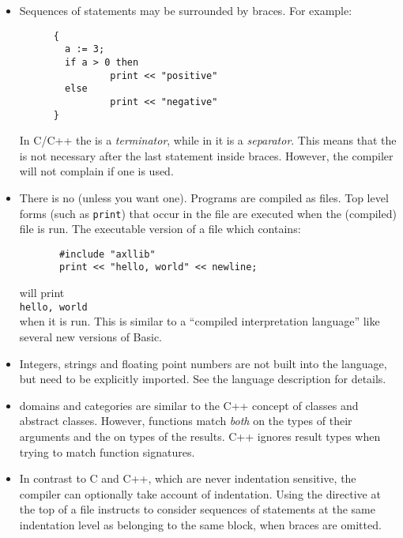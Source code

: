 \begin{itemize}
\item Sequences of statements may be surrounded by braces. For example:

\begin{small}
\begin{verbatim}
      {
        a := 3; 
        if a > 0 then
                print << "positive" 
        else 
                print << "negative"
      }
\end{verbatim}
\end{small}

In C/C++ the \ttin{;} is a {\em terminator}, while in \asharp{} it is a {\em
separator}. This means that the \ttin{;} is not necessary after the last
statement inside braces. However, the compiler will not complain if one
is used.

\item There is no  (unless you want one).
     Programs are compiled as files. Top level forms (such as \verb"print")
     that occur in the file are executed when the (compiled) file is run. The
     executable version of a file which contains:

\begin{small}%
\begin{verbatim}
       #include "axllib"
       print << "hello, world" << newline;
\end{verbatim}
\end{small}

     will print \\
     \verb+hello, world+ \\
     when it is run.
     This is similar to a ``compiled interpretation language'' like
     several new versions of Basic.

\item Integers, strings and floating point numbers
are not built into the language, but need to be explicitly imported.
See the language description for details.

\item domains and categories are similar to the C++ concept of
     classes and abstract classes.
     However, functions match {\em both\/} on the types of their arguments
     and the on types of the results. C++ ignores result types when trying 
     to match function signatures.

\item In contrast to C and C++, which are never indentation sensitive,
the \asharp{} compiler can optionally take account of indentation.
Using the  directive at the top of a file instructs
\asharp{} to consider sequences of statements at the same indentation
level as belonging to the same block, when braces are omitted.

\end{itemize}


